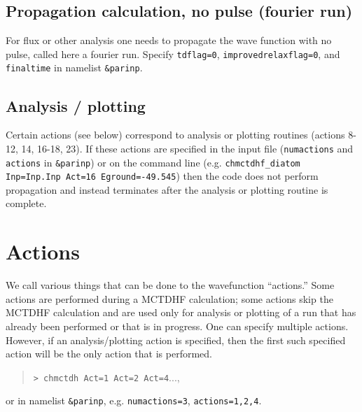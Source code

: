 \documentclass[10pt,leqno, oneside]{book}
\begin{document}




\section{Propagation calculation, no pulse (fourier run)}

For flux or other analysis one needs to propagate the wave function with no pulse, called here a fourier run.
Specify \verb#tdflag=0#, \verb#improvedrelaxflag=0#, and \verb#finaltime# in namelist \verb#&parinp#.

\section{Analysis / plotting}

Certain actions (see below) correspond to analysis or plotting routines (actions 8-12, 14, 16-18, 23).  If these actions are specified
in the input file (\verb#numactions# and \verb#actions# in \verb#&parinp#) or on the command line
 (e.g. \verb#chmctdhf_diatom Inp=Inp.Inp Act=16 Eground=-49.545#)
then the code does not perform propagation and instead terminates after the analysis or plotting routine is complete.




\chapter{Actions}

We call various things that can be done to the wavefunction ``actions.''  
Some actions are performed during a MCTDHF calculation; some actions skip the MCTDHF calculation and are used only for analysis or plotting of a run
that has already been performed or that is in progress.  
One can specify multiple actions.  However, if an analysis/plotting action is specified, then the first such specified action will be the only action that is performed.
\begin{quote}
\verb#> chmctdh Act=1 Act=2 Act=4#..., 
\end{quote}
or in namelist \verb#&parinp#, e.g. \verb#numactions=3#, \verb#actions=1,2,4#.
\end{document}
